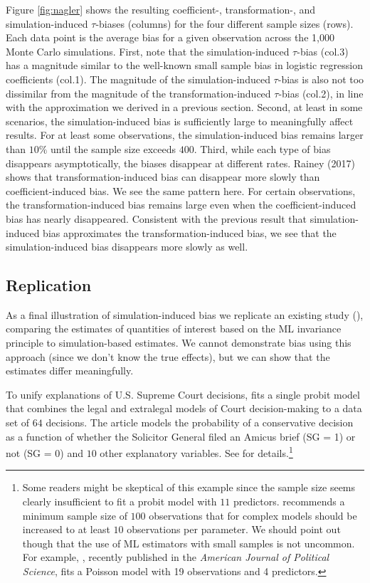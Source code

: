 \documentclass[11pt]{article}
\begin{document}
Figure \ref{fig:nagler} shows the resulting coefficient-, transformation-, and simulation-induced $\tau$-biases (columns) for the four different sample sizes (rows). Each data point is the average bias for a given observation across the 1,000 Monte Carlo simulations. First, note that the simulation-induced $\tau$-bias (col.\@ 3) has a magnitude similar to the well-known small sample bias in logistic regression coefficients (col.\@ 1). The magnitude of the simulation-induced $\tau$-bias is also not too dissimilar from the magnitude of the transformation-induced $\tau$-bias (col.\@ 2), in line with the approximation we derived in a previous section. Second, at least in some scenarios, the simulation-induced bias is sufficiently large to meaningfully affect results. For at least some observations, the simulation-induced bias remains larger than $10\%$ until the sample size exceeds $400$. Third, while each type of bias disappears asymptotically, the biases disappear at different rates. Rainey (2017) shows that transformation-induced bias can disappear more slowly than coefficient-induced bias. We see the same pattern here. For certain observations, the transformation-induced bias remains large even when the coefficient-induced bias has nearly disappeared. Consistent with the previous result that simulation-induced bias approximates the transformation-induced bias, we see that the simulation-induced bias disappears more slowly as well.



\subsection*{Replication}

As a final illustration of simulation-induced bias we replicate an existing study (\citealt{GeorgeEpstein1992}), comparing the estimates of quantities of interest based on the ML invariance principle to simulation-based estimates. We cannot demonstrate bias using this approach (since we don't know the true effects), but we can show that the estimates differ meaningfully.


To unify explanations of U.S. Supreme Court decisions, \cite{GeorgeEpstein1992} fits a single probit model that combines the legal and extralegal models of Court decision-making to a data set of $64$ decisions. The article models the probability of a conservative decision as a function of whether the Solicitor General filed an Amicus brief (SG = 1) or not (SG = 0) and $10$ other explanatory variables. See \cite{GeorgeEpstein1992} for details.\footnote{Some readers might be skeptical of this example since the sample size seems clearly insufficient to fit a probit model with $11$ predictors. \citet[3.5.1]{Long1997} recommends a minimum sample size of $100$ observations that for complex models should be increased to at least $10$ observations per parameter. We should point out though that the use of ML estimators with small samples is not uncommon. For example, \cite{Holland2015}, recently published in the \emph{American Journal of Political Science}, fits a Poisson model with 19 observations and 4 predictors.}
\end{document}
